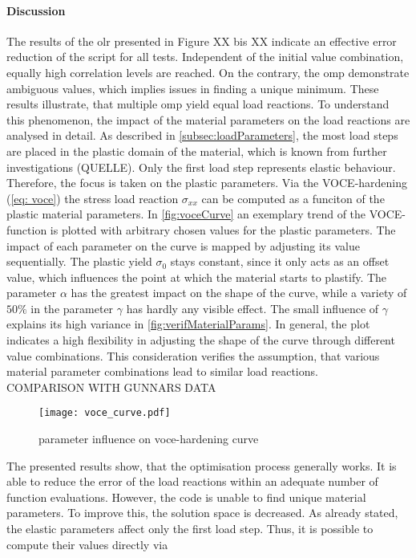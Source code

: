 \paragraph{Discussion}
The results of the \acrlong{olr} presented in Figure XX bis XX indicate an effective error reduction of the script for all tests. Independent of the initial value combination, equally high correlation levels are reached. On the contrary, the \acrlong{omp} demonstrate ambiguous values, which implies issues in finding a unique minimum. These results illustrate, that multiple \acrlong{omp} yield equal load reactions. To understand this phenomenon, the impact of the material parameters on the load reactions are analysed in detail. As described in \autoref{subsec:loadParameters}, the most load steps are placed in the plastic domain of the material, which is known from further investigations (QUELLE). Only the first load step represents elastic behaviour. Therefore, the focus is taken on the plastic parameters. Via the VOCE-hardening (\autoref{eq: voce}) the stress load reaction $\sigma_{xx}$ can be computed as a funciton of the plastic material parameters.
In \autoref{fig:voceCurve} an exemplary trend of the VOCE-function is plotted with arbitrary chosen values for the plastic parameters. The impact of each parameter on the curve is mapped by adjusting its value sequentially. The plastic yield $\sigma_0$ stays constant, since it only acts as an offset value, which influences the point at which the material starts to plastify. The parameter $\alpha$ has the greatest impact on the shape of the curve, while a variety of \(50\%\) in the parameter $\gamma$ has hardly any visible effect. The small influence of $\gamma$ explains its high variance in \autoref{fig:verifMaterialParams}. In general, the plot indicates a high flexibility in adjusting the shape of the curve through different value combinations. This consideration verifies the assumption, that various material parameter combinations lead to similar load reactions. \\

COMPARISON WITH GUNNARS DATA

\begin{figure}[H]
    \centering
    \texttt{[image: voce\_curve.pdf]}
    \caption{parameter influence on voce-hardening curve}
    \label{fig:voceCurve}
\end{figure}

The presented results show, that the optimisation process generally works. It is able to reduce the error of the load reactions within an adequate number of function evaluations. However, the code is unable to find unique material parameters. To improve this, the solution space is decreased. As already stated, the elastic parameters affect only the first load step. Thus, it is possible to compute their values directly via

